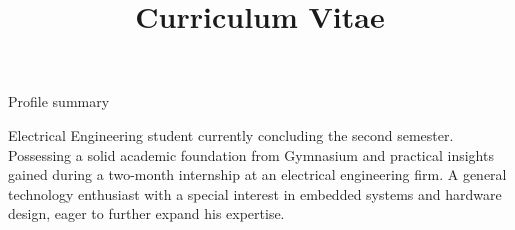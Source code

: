 \documentclass[a4paper,skipsamekey,11pt,english]{curve}
\title{Curriculum Vitae}
\begin{document}
\makeheaders[c]
\vspace{-2.5em}

\begin{rubric}{Profile summary}
\vspace{0.2em}
\parbox{\textwidth}{
Electrical Engineering student currently concluding the second semester. Possessing a solid academic foundation from Gymnasium and practical insights gained during a two-month internship at an electrical engineering firm. A general technology enthusiast with a special interest in embedded systems and hardware design, eager to further expand his expertise.
}
\end{rubric}
\vspace{-0.5em}
\vspace{-1.1em}
\vspace{-1.1em}

    
    
    
    

\vspace{-0.9em}
\end{document}

